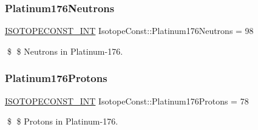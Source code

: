 \subsubsection{\texorpdfstring{Platinum176\+Neutrons}{Platinum176Neutrons}}
{\footnotesize\ttfamily \mbox{\hyperlink{group___isotope_const-_macros_ga5f18360b3e99483a35c32d789e62621c}{I\+S\+O\+T\+O\+P\+E\+C\+O\+N\+S\+T\+\_\+\+I\+NT}} Isotope\+Const\+::\+Platinum176\+Neutrons = 98}

\$ \$ Neutrons in Platinum-\/176. \mbox{\label{group___isotope_const-_platinum-_pt176_ga351ca7fcda72a9a006001bd9fc82daba}} 
\subsubsection{\texorpdfstring{Platinum176\+Protons}{Platinum176Protons}}
{\footnotesize\ttfamily \mbox{\hyperlink{group___isotope_const-_macros_ga5f18360b3e99483a35c32d789e62621c}{I\+S\+O\+T\+O\+P\+E\+C\+O\+N\+S\+T\+\_\+\+I\+NT}} Isotope\+Const\+::\+Platinum176\+Protons = 78}

\$ \$ Protons in Platinum-\/176. 